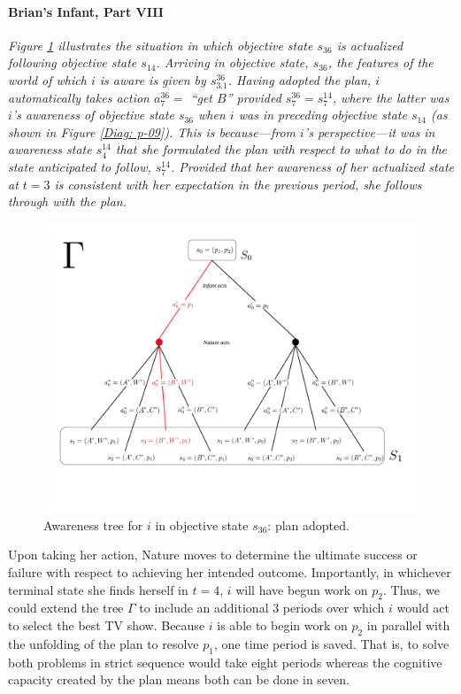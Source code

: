 \documentclass[
11pt,
titlepage,
reqno,
]{article}%
\theoremstyle{definition}
\begin{document}
\paragraph{Brian's Infant, Part VIII}
{\em
Figure \ref{Diag: p-10} illustrates the situation in which objective state $s_{36}$ is actualized following objective state $s_{14}$.
Arriving in objective state, $s_{36}$, the features of the world of which $i$ is aware is given by $s^{36}_{3.1}$.
Having adopted the plan, $i$ automatically takes action $a^{36}_7=$ ``get $B$'' provided $s^{36}_{7}=s^{14}_{7}$, where the latter was $i$'s awareness of objective state $s_{36}$ when $i$ was in  preceding objective state $s_{14}$ (as shown in Figure \ref{Diag: p-09}).
This is because---from $i$'s perspective---it was in awareness state $s^{14}_{4}$ that she formulated the plan with respect to what to do in the state anticipated to follow, $s^{14}_{7}$.
Provided that her awareness of her actualized state at $t=3$ is consistent with her expectation in the previous period,  she follows through with the plan.

\begin{figure}[h!]
	\centering
	\includegraphics*[page=10,trim = 0in 0in .5in 0in,scale=.6]{Awareness_Diagrams_All}
	\caption{Awareness tree for $i$ in objective state $s_{36}$: plan adopted.\label{Diag: p-10}}%
\end{figure}

Upon taking her action, Nature moves to determine the ultimate success or failure with respect to achieving her intended outcome.
Importantly, in whichever terminal state she finds herself in $t=4$, $i$ will have begun work on $p_2$. 
Thus, we could extend the tree $\Gamma$ to include an additional 3 periods over which $i$ would act to select the best TV show.
Because $i$ is able to begin work on $p_2$ in parallel with the unfolding of the plan to resolve $p_1$, one time period is saved.
That is, to solve both problems in strict sequence would take eight periods whereas the cognitive capacity created by the plan means both can be done in seven.
}
\end{document}
